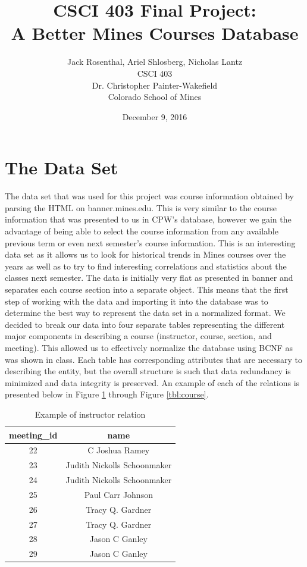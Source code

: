 \documentclass[12pt,letterpaper,titlepage]{article}
\title{CSCI 403 Final Project:\\
       A Better Mines Courses Database}
\date{December 9, 2016}
\author{Jack Rosenthal, Ariel Shlosberg, Nicholas Lantz\\
        \small CSCI 403\\
        \small Dr. Christopher Painter-Wakefield\\
        \small Colorado School of Mines}
\begin{document}
\maketitle

\section{The Data Set}
The data set that was used for this project was course information obtained by parsing the HTML on banner.mines.edu. This is very similar to the course information that was presented to us in CPW's database, however we gain the advantage of being able to select the course information from any available previous term or even next semester's course information. This is an interesting data set as it allows us to look for historical trends in Mines courses over the years as well as to try to find interesting correlations and statistics about the classes next semester. The data is initially very flat as presented in banner and separates each course section into a separate object. This means that the first step of working with the data and importing it into the database was to determine the best way to represent the data set in a normalized format. We decided to break our data into four separate tables representing the different major components in describing a course (instructor, course, section, and meeting). This allowed us to effectively normalize the database using BCNF as was shown in class. Each table has corresponding attributes that are necessary to describing the entity, but the overall structure is such that data redundancy is minimized and data integrity is preserved. An example of each of the relations is presented below in Figure \ref{tbl:instructor} through Figure \ref{tbl:course}.

\begin{table}[H]
\centering
\begin{tabular}{|c|c|}
\hline
meeting\_id & name \\ \hline
22 & C Joshua Ramey \\ \hline
23 & Judith Nickolls Schoonmaker \\ \hline
24 & Judith Nickolls Schoonmaker \\ \hline
25 & Paul Carr Johnson \\ \hline
26 & Tracy Q. Gardner \\ \hline
27 & Tracy Q. Gardner \\ \hline
28 & Jason C Ganley \\ \hline
29 & Jason C Ganley \\ \hline
\end{tabular}
\caption{\label{tbl:instructor} Example of instructor relation}
\end{table}
\end{document}
